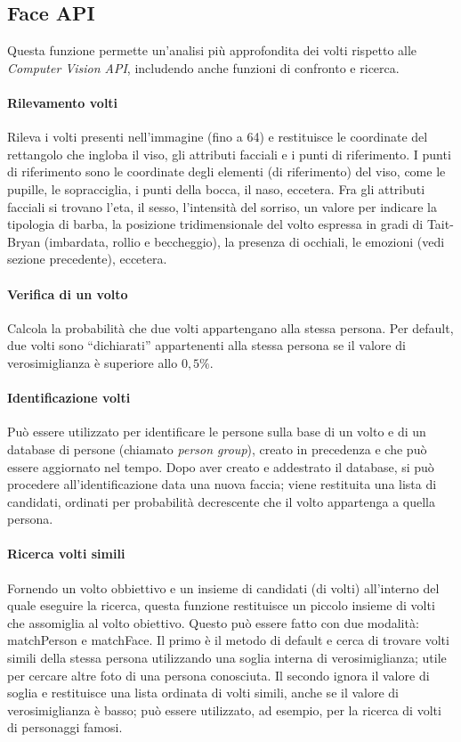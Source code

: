 \subsection{Face API}
Questa funzione permette un'analisi più approfondita dei volti rispetto alle \textit{Computer Vision API}, includendo anche funzioni di confronto e ricerca.

\paragraph{Rilevamento volti} Rileva i volti presenti nell'immagine (fino a 64) e restituisce le coordinate del rettangolo che ingloba il viso, gli attributi facciali
e i punti di riferimento.
I punti di riferimento sono le coordinate degli elementi (di riferimento) del viso, come le pupille, le sopracciglia, i punti della bocca, il naso, eccetera.
Fra gli attributi facciali si trovano l'eta, il sesso, l'intensità del sorriso, un valore per indicare la tipologia di barba, la posizione tridimensionale del volto
espressa in gradi di Tait-Bryan (imbardata, rollio e beccheggio), la presenza di occhiali, le emozioni (vedi sezione precedente), eccetera.

\paragraph{Verifica di un volto} Calcola la probabilità che due volti appartengano alla stessa persona.
Per default, due volti sono ``dichiarati'' appartenenti alla stessa persona se il valore di verosimiglianza è superiore allo $0,5\%$.

\paragraph{Identificazione volti} Può essere utilizzato per identificare le persone sulla base di un volto e di un database di persone (chiamato \textit{person group}),
creato in precedenza e che può essere aggiornato nel tempo.
Dopo aver creato e addestrato il database, si può procedere all'identificazione data una nuova faccia;
viene restituita una lista di candidati, ordinati per probabilità decrescente che il volto appartenga a quella persona.

\paragraph{Ricerca volti simili} Fornendo un volto obbiettivo e un insieme di candidati (di volti) all'interno del quale eseguire la ricerca,
questa funzione restituisce un piccolo insieme di volti che assomiglia al volto obiettivo.
Questo può essere fatto con due modalità: \textsf{matchPerson} e \textsf{matchFace}.
Il primo è il metodo di default e cerca di trovare volti simili della stessa persona utilizzando una soglia interna di verosimiglianza;
utile per cercare altre foto di una persona conosciuta.
Il secondo ignora il valore di soglia e restituisce una lista ordinata di volti simili, anche se il valore di verosimiglianza è basso;
può essere utilizzato, ad esempio, per la ricerca di volti di personaggi famosi.

